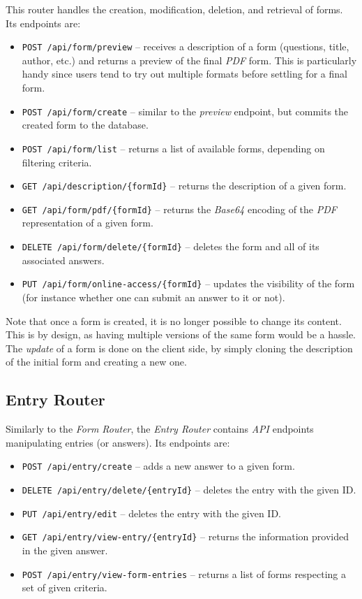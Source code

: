 \documentclass[11pt, a4paper]{report}
\def\code#1{\texttt{#1}}
\begin{document}
This router handles the creation, modification, deletion, and retrieval of forms. Its endpoints are:
\begin{itemize}
    \item \code{POST /api/form/preview} -- receives a description of a form (questions, title, author, etc.) and returns a preview of the final \textit{PDF} form. This is particularly handy since users tend to try out multiple formats before settling for a final form.
    \item \code{POST /api/form/create} -- similar to the \textit{preview} endpoint, but commits the created form to the database.
    \item \code{POST /api/form/list} -- returns a list of available forms, depending on filtering criteria.
    \item \code{GET /api/description/\{formId\}} -- returns the description of a given form.
    \item \code{GET /api/form/pdf/\{formId\}} -- returns the \textit{Base64} encoding of the \textit{PDF} representation of a given form.
    \item \code{DELETE /api/form/delete/\{formId\}} -- deletes the form and all of its associated answers.
    \item \code{PUT /api/form/online-access/\{formId\}} -- updates the visibility of the form (for instance whether one can submit an answer to it or not).
\end{itemize}

Note that once a form is created, it is no longer possible to change its content. This is by design, as having multiple versions of the same form would be a hassle. The \textit{update} of a form is done on the client side, by simply cloning the description of the initial form and creating a new one.

\subsection{Entry Router}

Similarly to the \textit{Form Router}, the \textit{Entry Router} contains \textit{API} endpoints manipulating entries (or answers). Its endpoints are:
\begin{itemize}
    \item \code{POST /api/entry/create} -- adds a new answer to a given form.
    \item \code{DELETE /api/entry/delete/\{entryId\}} -- deletes the entry with the given ID.
    \item \code{PUT /api/entry/edit} -- deletes the entry with the given ID.
    \item \code{GET /api/entry/view-entry/\{entryId\}} -- returns the information provided in the given answer.
    \item \code{POST /api/entry/view-form-entries} -- returns a list of forms respecting a set of given criteria.
\end{itemize}
\end{document}
